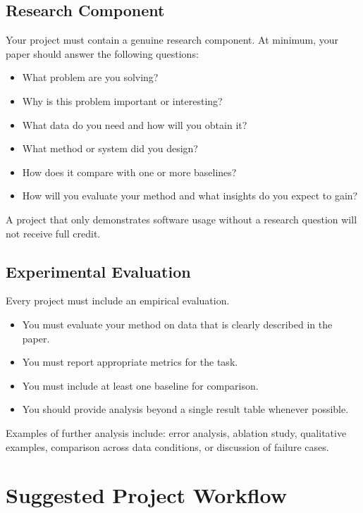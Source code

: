 \documentclass{article}
\begin{document}
\subsection{Research Component}

Your project must contain a genuine research component.
At minimum, your paper should answer the following questions:

\begin{itemize}
  \item What problem are you solving?
  \item Why is this problem important or interesting?
  \item What data do you need and how will you obtain it?
  \item What method or system did you design?
  \item How does it compare with one or more baselines?
  \item How will you evaluate your method and what insights do you expect to gain?
\end{itemize}

\noindent A project that only demonstrates software usage without a research question will not receive full credit.

\subsection{Experimental Evaluation}

Every project must include an empirical evaluation.

\begin{itemize}
  \item You must evaluate your method on data that is clearly described in the paper.
  \item You must report appropriate metrics for the task.
  \item You must include at least one baseline for comparison.
  \item You should provide analysis beyond a single result table whenever possible.
\end{itemize}

\noindent Examples of further analysis include:
error analysis, ablation study, qualitative examples, comparison across data conditions,
or discussion of failure cases.

\section{Suggested Project Workflow}
\end{document}
